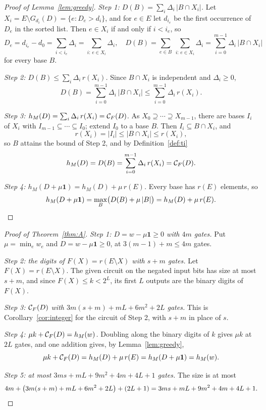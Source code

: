 \begin{proof}[Proof of Lemma~\ref{lem:greedy}]
\emph{Step 1: $D(B)=\sum_i\Delta_i\,|B\cap X_i|$.}  Let $X_i=E\setminus G_{d_i}(D)=\{e:D_e>d_i\}$, and for
$e\in E$ let $d_{i_e}$ be the first occurrence of $D_e$ in the sorted list.  Then
$e\in X_i$ if and only if $i<i_e$, so
\[
  D_e=d_{i_e}-d_0=\sum_{i<i_e}\Delta_i=\sum_{i:\,e\in X_i}\Delta_i,
  \quad
  D(B)=\sum_{e\in B}\ \sum_{i:\,e\in X_i}\Delta_i=\sum_{i=0}^{m-1}\Delta_i\,|B\cap X_i|
\]
for every base $B$.

\emph{Step 2: $D(B)\le\sum_i\Delta_i\,r(X_i)$.}  Since $B\cap X_i$ is independent and $\Delta_i\ge0$,
\[
  D(B)=\sum_{i=0}^{m-1}\Delta_i\,|B\cap X_i|\le\sum_{i=0}^{m-1}\Delta_i\,r(X_i).
\]

\emph{Step 3: $h_M(D)=\sum_i\Delta_i\,r(X_i)=\mathcal C_F(D)$.}  As $X_0\supseteq\cdots\supseteq X_{m-1}$,
there are bases $I_i$ of $X_i$ with $I_{m-1}\subseteq\cdots\subseteq I_0$; extend
$I_0$ to a base $B$.  Then $I_i\subseteq B\cap X_i$, and
\[
  r(X_i)=|I_i|\le|B\cap X_i|\le r(X_i),
\]
so $B$ attains the bound of Step 2, and by Definition~\ref{def:ti}
\[
  h_M(D)=D(B)=\sum_{i=0}^{m-1}\Delta_i\,r(X_i)=\mathcal C_F(D).
\]

\emph{Step 4: $h_M(D+\mu\mathbf 1)=h_M(D)+\mu\,r(E)$.}  Every base has $r(E)$ elements, so
\[
  h_M(D+\mu\mathbf 1)=\max_{B}\bigl(D(B)+\mu\,|B|\bigr)=h_M(D)+\mu\,r(E).\qedhere
\]
\end{proof}

\begin{proof}[Proof of Theorem~\ref{thm:A}]
\emph{Step 1: $D=w-\mu\mathbf 1\ge0$ with $4m$ gates.}  Put $\mu=\min_ew_e$ and $D=w-\mu\mathbf 1\ge0$, at
$3(m-1)+m\le4m$ gates.

\emph{Step 2: the digits of $F(X)=r(E\setminus X)$ with $s+m$ gates.}  Let $F(X)=r(E\setminus X)$.  The given circuit
on the negated input bits has size at most $s+m$, and since $F(X)\le k<2^{L}$,
its first $L$ outputs are the binary digits of $F(X)$.

\emph{Step 3: $\mathcal C_F(D)$ with $3m(s+m)+mL+6m^{2}+2L$ gates.}  This is Corollary~\ref{cor:integer} for the circuit of Step 2, with $s+m$ in
place of $s$.

\emph{Step 4: $\mu k+\mathcal C_F(D)=h_M(w)$.}  Doubling along the binary digits of $k$ gives $\mu k$
at $2L$ gates, and one addition gives, by Lemma~\ref{lem:greedy},
\[
  \mu k+\mathcal C_F(D)=h_M(D)+\mu\,r(E)=h_M(D+\mu\mathbf 1)=h_M(w).
\]

\emph{Step 5: at most $3ms+mL+9m^{2}+4m+4L+1$ gates.}  The size is at most
\[
  4m+\bigl(3m(s+m)+mL+6m^{2}+2L\bigr)+(2L+1)=3ms+mL+9m^{2}+4m+4L+1.\qedhere
\]
\end{proof}

